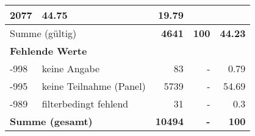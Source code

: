 \begin{longtable}{lXrrr}
       \num{2077} &
       \num[round-mode=places,round-precision=2]{44.75} &
         \num[round-mode=places,round-precision=2]{19.79} \\
     \midrule
     \multicolumn{2}{l}{Summe (gültig)} &
       \textbf{\num{4641}} &
     \textbf{\num{100}} &
       \textbf{\num[round-mode=places,round-precision=2]{44.23}} \\
     \multicolumn{5}{l}{\textbf{Fehlende Werte}}\\
       -998 &
       keine Angabe &
         \num{83} &
        - &
         \num[round-mode=places,round-precision=2]{0.79} \\
       -995 &
       keine Teilnahme (Panel) &
         \num{5739} &
        - &
         \num[round-mode=places,round-precision=2]{54.69} \\
       -989 &
       filterbedingt fehlend &
         \num{31} &
        - &
         \num[round-mode=places,round-precision=2]{0.3} \\
     \midrule
     \multicolumn{2}{l}{\textbf{Summe (gesamt)}} &
          \textbf{\num{10494}} &
        \textbf{-} &
        \textbf{\num{100}} \\
     \bottomrule
     \end{longtable}
     
